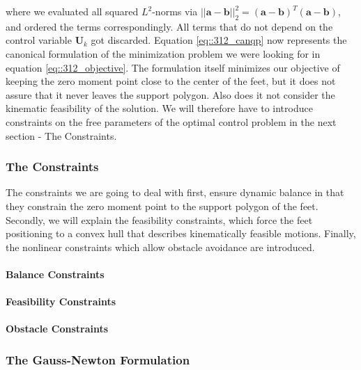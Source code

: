 where we evaluated all squared $L^2$-norms via $||\bm{a}-\bm{b}||^2_2 = (\bm{a}-\bm{b})^T(\bm{a}-\bm{b})$, and ordered the terms correspondingly. All terms that do not depend on the control variable $\bm{U}_k$ got discarded. Equation \ref{eq::312_canqp} now represents the canonical formulation of the minimization problem we were looking for in equation \ref{eq::312_objective}. The formulation itself minimizes our objective of keeping the zero moment point close to the center of the feet, but it does not assure that it never leaves the support polygon. Also does it not consider the kinematic feasibility of the solution. We will therefore have to introduce constraints on the free parameters of the optimal control problem in the next section - The Constraints.
\subsubsection{The Constraints}
The constraints we are going to deal with first, ensure dynamic balance in that they constrain the zero moment point to the support polygon of the feet. Secondly, we will explain the feasibility constraints, which force the feet positioning to a convex hull that describes kinematically feasible motions. Finally, the nonlinear constraints which allow obstacle avoidance are introduced.
\paragraph{Balance Constraints} 
\paragraph{Feasibility Constraints}
\paragraph{Obstacle Constraints}
\cite{herdt2010walking} %
\cite{naveau2016reactive} %
\subsubsection{The Gauss-Newton Formulation}